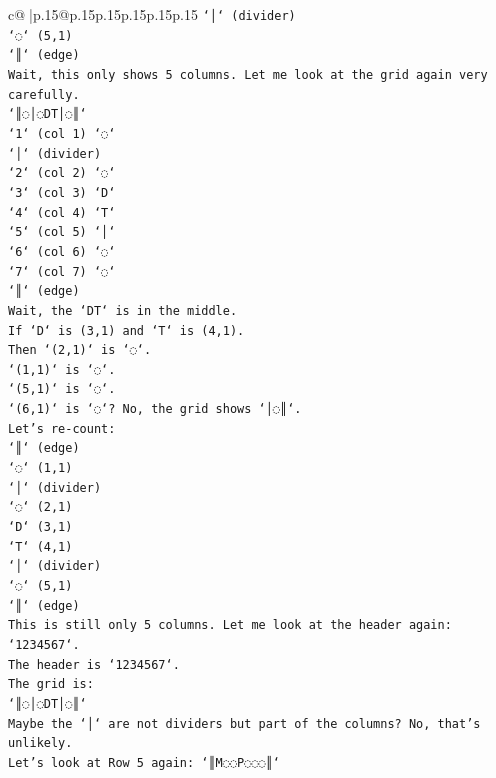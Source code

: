 \documentclass{article}
\begin{document}
{\begin{supertabular}{c@{$\;$}|p{.15\linewidth}@{}p{.15\linewidth}p{.15\linewidth}p{.15\linewidth}p{.15\linewidth}p{.15\linewidth}}
{{{\texttt{`│` (divider)} \\
\texttt{`◌` (5,1)} \\
\texttt{`║` (edge)} \\
\texttt{Wait, this only shows 5 columns. Let me look at the grid again very carefully.} \\
\texttt{`║◌│◌DT│◌║`} \\
\texttt{`1` (col 1) `◌`} \\
\texttt{`│` (divider)} \\
\texttt{`2` (col 2) `◌`} \\
\texttt{`3` (col 3) `D`} \\
\texttt{`4` (col 4) `T`} \\
\texttt{`5` (col 5) `│`} \\
\texttt{`6` (col 6) `◌`} \\
\texttt{`7` (col 7) `◌`} \\
\texttt{`║` (edge)} \\
\texttt{Wait, the `DT` is in the middle.} \\
\texttt{If `D` is (3,1) and `T` is (4,1).} \\
\texttt{Then `(2,1)` is `◌`.} \\
\texttt{`(1,1)` is `◌`.} \\
\texttt{`(5,1)` is `◌`.} \\
\texttt{`(6,1)` is `◌`? No, the grid shows `│◌║`.} \\
\texttt{Let's re{-}count:} \\
\texttt{`║` (edge)} \\
\texttt{`◌` (1,1)} \\
\texttt{`│` (divider)} \\
\texttt{`◌` (2,1)} \\
\texttt{`D` (3,1)} \\
\texttt{`T` (4,1)} \\
\texttt{`│` (divider)} \\
\texttt{`◌` (5,1)} \\
\texttt{`║` (edge)} \\
\texttt{This is still only 5 columns. Let me look at the header again: `1234567`.} \\
\texttt{The header is `1234567`.} \\
\texttt{The grid is:} \\
\texttt{`║◌│◌DT│◌║`} \\
\texttt{Maybe the `│` are not dividers but part of the columns? No, that's unlikely.} \\
\texttt{Let's look at Row 5 again: `║M◌◌P◌◌◌║`} \\
}}}
\end{supertabular}}
\end{document}
